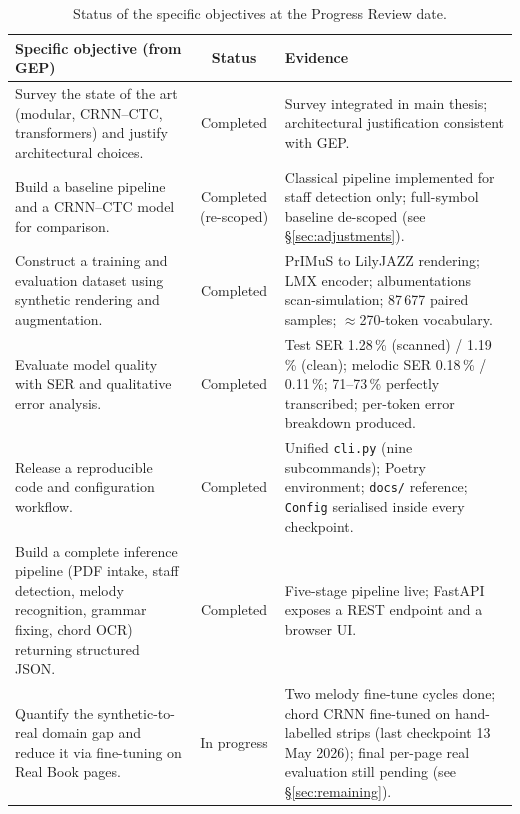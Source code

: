 \documentclass[11pt, a4paper]{article}
\begin{document}
\begin{table}[h!]
    \centering
    \caption{Status of the specific objectives at the Progress Review date.}
    \label{tab:obj-status}
    \renewcommand{\arraystretch}{1.2}
    \small
    \begin{tabularx}{\linewidth}{>{\raggedright\arraybackslash}p{6.5cm} c >{\raggedright\arraybackslash}X}
        \toprule
        \textbf{Specific objective (from GEP)} & \textbf{Status} & \textbf{Evidence} \\
        \midrule
        Survey the state of the art (modular, CRNN--CTC, transformers) and justify architectural choices. & Completed & Survey integrated in main thesis; architectural justification consistent with GEP. \\
        \midrule
        Build a baseline pipeline and a CRNN--CTC model for comparison. & Completed (re-scoped) & Classical pipeline implemented for staff detection only; full-symbol baseline de-scoped (see \S\ref{sec:adjustments}). \\
        \midrule
        Construct a training and evaluation dataset using synthetic rendering and augmentation. & Completed & PrIMuS to LilyJAZZ rendering; LMX encoder; albumentations scan-simulation; 87\,677 paired samples; $\approx$270-token vocabulary. \\
        \midrule
        Evaluate model quality with SER and qualitative error analysis. & Completed & Test SER 1.28\,\% (scanned) / 1.19\,\% (clean); melodic SER 0.18\,\% / 0.11\,\%; 71--73\,\% perfectly transcribed; per-token error breakdown produced. \\
        \midrule
        Release a reproducible code and configuration workflow. & Completed & Unified \texttt{cli.py} (nine subcommands); Poetry environment; \texttt{docs/} reference; \texttt{Config} serialised inside every checkpoint. \\
        \midrule
        Build a complete inference pipeline (PDF intake, staff detection, melody recognition, grammar fixing, chord OCR) returning structured JSON. & Completed & Five-stage pipeline live; FastAPI exposes a REST endpoint and a browser UI. \\
        \midrule
        Quantify the synthetic-to-real domain gap and reduce it via fine-tuning on Real Book pages. & In progress & Two melody fine-tune cycles done; chord CRNN fine-tuned on hand-labelled strips (last checkpoint 13 May 2026); final per-page real evaluation still pending (see \S\ref{sec:remaining}). \\
        \bottomrule
    \end{tabularx}
\end{table}
\end{document}

